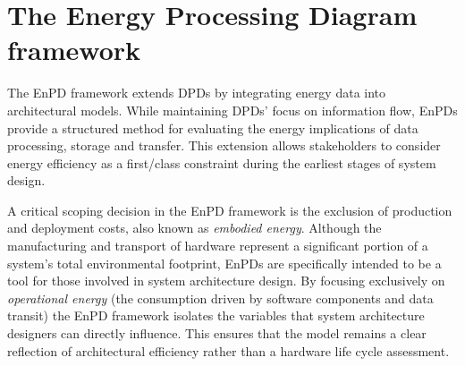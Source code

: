 \section{The Energy Processing Diagram framework}
The EnPD framework extends DPDs by integrating energy data into architectural models.
While maintaining DPDs' focus on information flow, EnPDs provide a structured method for evaluating the energy implications of data processing, storage and transfer.
This extension allows stakeholders to consider energy efficiency as a first\-/class constraint during the earliest stages of system design.

A critical scoping decision in the EnPD framework is the exclusion of production and deployment costs, also known as \emph{embodied energy}.
Although the manufacturing and transport of hardware represent a significant portion of a system's total environmental footprint, EnPDs are specifically intended to be a tool for those involved in system architecture design.
By focusing exclusively on \emph{operational energy} (the consumption driven by software components and data transit) the EnPD framework isolates the variables that system architecture designers can directly influence.
This ensures that the model remains a clear reflection of architectural efficiency rather than a hardware life cycle assessment.

